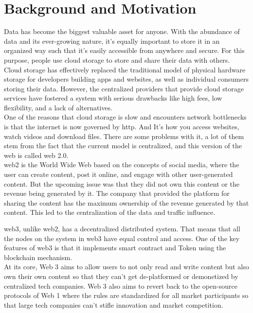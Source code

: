 
\section{Background and Motivation}

Data has become the biggest valuable asset for anyone. With the abundance of data and its ever-growing nature, it’s equally important to store it in an organized way such that it’s easily accessible from anywhere and secure. For this purpose, people use cloud storage to store and share their data with others. \\[-8pt]

Cloud storage has effectively replaced the traditional model of physical hardware storage for developers building apps and websites, as well as individual consumers storing their data. However, the centralized providers that provide cloud storage services have fostered a system with serious drawbacks like high fees, low flexibility, and a lack of alternatives. \\[-8pt]

One of the reasons that cloud storage is slow and encounters network bottlenecks is that the internet is now governed by \acrfull{http}. And It’s how you access websites, watch videos and download files. There are some problems with it, a lot of them stem from the fact that the current model is centralized, and this version of the web is called web 2.0. \\[-8pt]

\Gls{web2} is the World Wide Web based on the concepts of social media, where the user can create content, post it online, and engage with other user-generated content. But the upcoming issue was that they did not own this content or the revenue being generated by it. The company that provided the platform for sharing the content has the maximum ownership of the revenue generated by that content. This led to the centralization of the data and traffic influence.



\Gls{web3}, unlike \gls{web2}, has a \gls{decentralized} distributed system. That means that all the nodes on the system in \gls{web3} have equal control and access. One of the key features of \gls{web3} is that it implements \gls{smart contract} and Token using the \gls{blockchain} mechanism. \\[-8pt]

At its core, Web 3 aims to allow users to not only read and write content but also own their own content so that they can’t get de-platformed or demonetized by centralized tech companies. Web 3 also aims to revert back to the open-source protocols of Web 1 where the rules are standardized for all market participants so that large tech companies can’t stifle innovation and market competition. \\[-8pt]